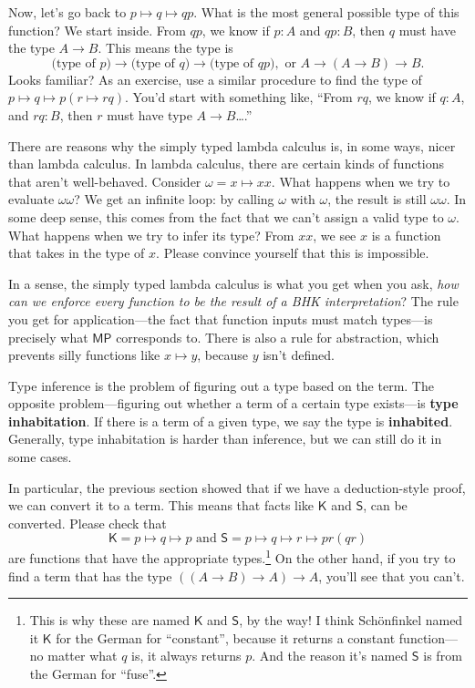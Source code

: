 \documentclass[11pt,paper=letter]{scrartcl}
\newcommand{\sf}{\mathsf}
\begin{document}
Now, let's go back to $p \mapsto q \mapsto qp$. What is the most general possible type of this function? We start inside. From $qp$, we know if $p : A$ and $qp : B$, then $q$ must have the type $A \to B$. This means the type is \[
  \text{(type of $p$)} \to \text{(type of $q$)} \to \text{(type of $qp$)}, \text{ or } A \to (A \to B) \to B.
\]
Looks familiar? As an exercise, use a similar procedure to find the type of $p \mapsto q \mapsto p(r \mapsto rq)$. You'd start with something like, ``From $rq$, we know if $q : A$, and $rq : B$, then $r$ must have type $A \to B$\dots.''

There are reasons why the simply typed lambda calculus is, in some ways, nicer than lambda calculus. In lambda calculus, there are certain kinds of functions that aren't well-behaved. Consider $\omega = x \mapsto xx$. What happens when we try to evaluate $\omega\omega$? We get an infinite loop: by calling $\omega$ with $\omega$, the result is still $\omega\omega$. In some deep sense, this comes from the fact that we can't assign a valid type to $\omega$. What happens when we try to infer its type? From $xx$, we see $x$ is a function that takes in the type of $x$. Please convince yourself that this is impossible.

In a sense, the simply typed lambda calculus is what you get when you ask, \emph{how can we enforce every function to be the result of a BHK interpretation}? The rule you get for application---the fact that function inputs must match types---is precisely what $\sf{MP}$ corresponds to. There is also a rule for abstraction, which prevents silly functions like $x \mapsto y$, because $y$ isn't defined.

Type inference is the problem of figuring out a type based on the term. The opposite problem---figuring out whether a term of a certain type exists---is \textbf{type inhabitation}. If there is a term of a given type, we say the type is \textbf{inhabited}. Generally, type inhabitation is harder than inference, but we can still do it in some cases.

In particular, the previous section showed that if we have a deduction-style proof, we can convert it to a term. This means that facts like $\sf{K}$ and $\sf{S}$, can be converted. Please check that \[
  \sf{K} = p \mapsto q \mapsto p
  \text{ and }
  \sf{S} = p \mapsto q \mapsto r \mapsto pr(qr)
\]
are functions that have the appropriate types.\footnote{This is why these are named $\sf{K}$ and $\sf{S}$, by the way! I think Schönfinkel named it $\sf{K}$ for the German for ``constant'', because it returns a constant function---no matter what $q$ is, it always returns $p$. And the reason it's named $\sf{S}$ is from the German for ``fuse''.} On the other hand, if you try to find a term that has the type $((A \to B) \to A) \to A$, you'll see that you can't.
\end{document}
